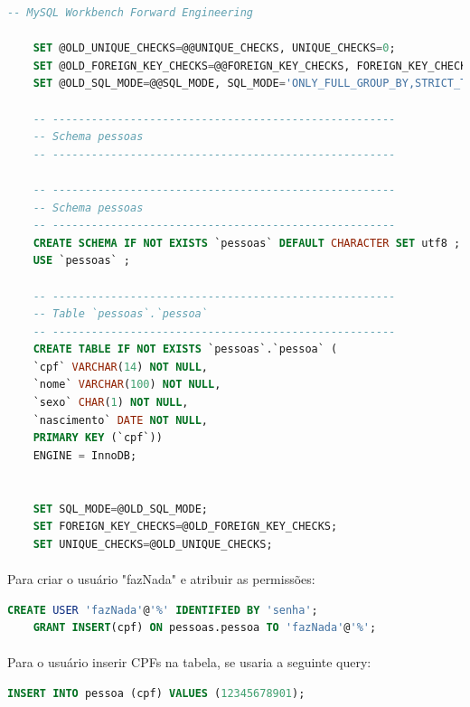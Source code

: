 \documentclass{article}
\begin{document}
\begin{lstlisting}[language=SQL]
    -- MySQL Workbench Forward Engineering

    SET @OLD_UNIQUE_CHECKS=@@UNIQUE_CHECKS, UNIQUE_CHECKS=0;
    SET @OLD_FOREIGN_KEY_CHECKS=@@FOREIGN_KEY_CHECKS, FOREIGN_KEY_CHECKS=0;
    SET @OLD_SQL_MODE=@@SQL_MODE, SQL_MODE='ONLY_FULL_GROUP_BY,STRICT_TRANS_TABLES,NO_ZERO_IN_DATE,NO_ZERO_DATE,ERROR_FOR_DIVISION_BY_ZERO,NO_ENGINE_SUBSTITUTION';

    -- -----------------------------------------------------
    -- Schema pessoas
    -- -----------------------------------------------------

    -- -----------------------------------------------------
    -- Schema pessoas
    -- -----------------------------------------------------
    CREATE SCHEMA IF NOT EXISTS `pessoas` DEFAULT CHARACTER SET utf8 ;
    USE `pessoas` ;

    -- -----------------------------------------------------
    -- Table `pessoas`.`pessoa`
    -- -----------------------------------------------------
    CREATE TABLE IF NOT EXISTS `pessoas`.`pessoa` (
    `cpf` VARCHAR(14) NOT NULL,
    `nome` VARCHAR(100) NOT NULL,
    `sexo` CHAR(1) NOT NULL,
    `nascimento` DATE NOT NULL,
    PRIMARY KEY (`cpf`))
    ENGINE = InnoDB;


    SET SQL_MODE=@OLD_SQL_MODE;
    SET FOREIGN_KEY_CHECKS=@OLD_FOREIGN_KEY_CHECKS;
    SET UNIQUE_CHECKS=@OLD_UNIQUE_CHECKS;
\end{lstlisting}

\paragraph{} Para criar o usuário "fazNada" e atribuir as permissões:

\begin{lstlisting}[language=SQL]
    CREATE USER 'fazNada'@'%' IDENTIFIED BY 'senha';
    GRANT INSERT(cpf) ON pessoas.pessoa TO 'fazNada'@'%';
\end{lstlisting}

\paragraph{} Para o usuário inserir CPFs na tabela, se usaria a seguinte query:

\begin{lstlisting}[language=SQL]
    INSERT INTO pessoa (cpf) VALUES (12345678901);
\end{lstlisting}
\end{document}
